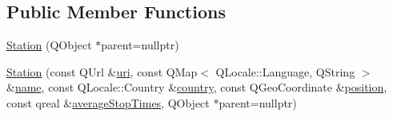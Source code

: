 \subsection*{Public Member Functions}
\begin{DoxyCompactItemize}
\item 
\mbox{\hyperlink{classCSA_1_1Station_a1ad546688826ab32a6451de33a5f20ca}{Station}} (Q\+Object $\ast$parent=nullptr)
\item 
\mbox{\hyperlink{classCSA_1_1Station_ab3703dee8550b5b6b72b83f4bc09cddc}{Station}} (const Q\+Url \&\mbox{\hyperlink{classCSA_1_1Station_addca2c54d5e9ce61c4ef9c3ee9ff4100}{uri}}, const Q\+Map$<$ Q\+Locale\+::\+Language, Q\+String $>$ \&\mbox{\hyperlink{classCSA_1_1Station_ad4442763fc108cde8368260119c007da}{name}}, const Q\+Locale\+::\+Country \&\mbox{\hyperlink{classCSA_1_1Station_ac54cea5fde8ba6e2367f0317965d9147}{country}}, const Q\+Geo\+Coordinate \&\mbox{\hyperlink{classCSA_1_1Station_a94249de9cc38d704eb6e77aca24daaea}{position}}, const qreal \&\mbox{\hyperlink{classCSA_1_1Station_aa8f1c3bfa7b4a3ad9ccc805ff7a2b931}{average\+Stop\+Times}}, Q\+Object $\ast$parent=nullptr)
\item 

\end{DoxyCompactItemize}
